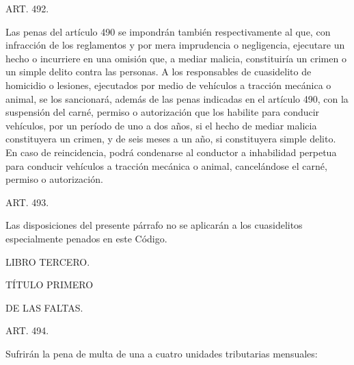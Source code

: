     ART. 492.

    Las penas del artículo 490 se impondrán también respectivamente al que, con infracción de los reglamentos y por mera imprudencia o negligencia, ejecutare un hecho o incurriere en una omisión que, a mediar malicia, constituiría un crimen o un simple delito contra las personas.
    A los responsables de cuasidelito de homicidio o lesiones, ejecutados por medio de vehículos a tracción mecánica o animal, se los sancionará, además de las penas indicadas en el artículo 490, con la suspensión del carné, permiso o autorización que los habilite para conducir vehículos, por un período de uno a dos años, si el hecho de mediar malicia constituyera un crimen, y de seis meses a un año, si constituyera simple delito. En caso de reincidencia, podrá condenarse al conductor a inhabilidad perpetua para conducir vehículos a tracción mecánica o animal, cancelándose el carné, permiso o autorización.


    ART. 493.

    Las disposiciones del presente párrafo no se aplicarán a los cuasidelitos especialmente penados en este Código.



    LIBRO TERCERO.


    TÍTULO PRIMERO

    DE LAS FALTAS.


    ART. 494.

    Sufrirán la pena de multa de una a cuatro unidades tributarias mensuales:

